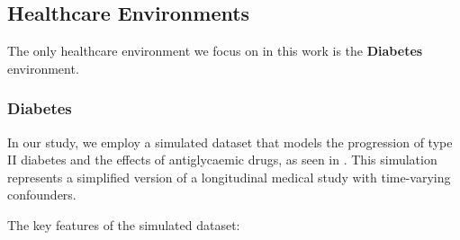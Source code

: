 \subsection{Healthcare Environments}

The only healthcare environment we focus on in this work is
the \textbf{Diabetes} environment.

\subsubsection{Diabetes}

In our study, we employ a simulated dataset that models
the progression of type II diabetes and the effects of antiglycaemic drugs,
as seen in \cite{sim2012}.
This simulation represents a simplified version of a longitudinal
medical study with time-varying confounders.

The key features of the simulated dataset:

